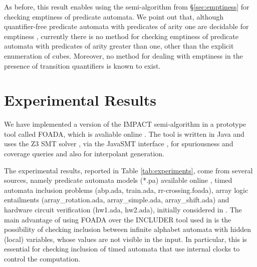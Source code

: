 As before, this result enables using the
semi-algorithm from \S\ref{sec:emptiness} for checking emptiness of
predicate automata.  We point out that, although quantifier-free
predicate automata with predicates of arity one are decidable for
emptiness \cite{Farzan15}, currently there is no method for checking
emptiness of predicate automata with predicates of arity greater than
one, other than the explicit enumeration of cubes. Moreover, no method
for dealing with emptiness in the presence of transition quantifiers
is known to exist.
\fi

\section{Experimental Results}

We have implemented a version of the IMPACT semi-algorithm
\cite{McMillan06} in a prototype tool called FOADA, which is avaliable
online \cite{foada}. The tool is written in Java and uses the Z3 SMT
solver \cite{z3}, via the JavaSMT interface \cite{javasmt}, for
spuriousness and coverage queries and also for interpolant generation. 

The experimental results, reported in Table \ref{tab:experiments},
come from several sources, namely predicate automata models (*.pa)
\cite{Farzan15,Farzan16} available online \cite{pa}, timed automata
inclusion problems (abp.ada, train.ada, rr-crossing.foada), array
logic entailments (array\_rotation.ada, array\_simple.ada,
array\_shift.ada) and hardware circuit verification (hw1.ada,
hw2.ada), initially considered in \cite{IosifRV16}. The main advantage
of using FOADA over the INCLUDER \cite{includer} tool used in
\cite{IosifRV16} is the possibility of checking inclusion between
infinite alphabet automata with hidden (local) variables, whose values
are not visible in the input. In particular, this is essential for
checking inclusion of timed automata that use internal clocks to
control the computation. 

